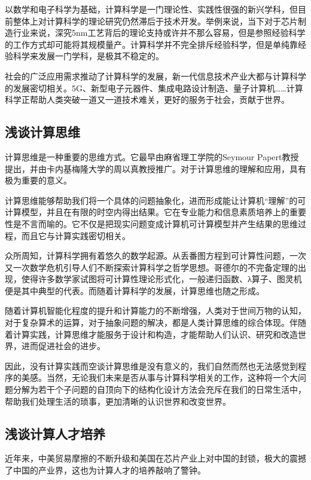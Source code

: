 \documentclass{article}
\begin{document}
以数学和电子科学为基础，计算科学是一门理论性、实践性很强的新兴学科，但目前整体上对计算科学的理论研究仍然滞后于技术开发。举例来说，当下对于芯片制造行业来说，深究5nm工艺背后的理论支持或许并不那么容易，但是参照经验科学的工作方式却可能将其规模量产。计算科学并不完全排斥经验科学，但是单纯靠经验科学来发展一门学科，是极其不稳定的。

社会的广泛应用需求推动了计算科学的发展，新一代信息技术产业大都与计算科学的发展密切相关。5G、新型电子元器件、集成电路设计制造、量子计算机……计算科学正帮助人类突破一道又一道技术难关，更好的服务于社会，贡献于世界。

\subsection{浅谈计算思维}

计算思维是一种重要的思维方式\cite{ref1}。它最早由麻省理工学院的Seymour Papert教授提出\cite{ref2}，并由卡内基梅隆大学的周以真教授推广\cite{ref3}。对于计算思维的理解和应用，具有极为重要的意义。

计算思维能够帮助我们将一个具体的问题抽象化，进而形成能让计算机“理解”的可计算模型，并且在有限的时空内得出结果。它在专业能力和信息素质培养上的重要性是不言而喻的。它不仅是把现实问题变成计算机可计算模型并产生结果的思维过程，而且它与计算实践密切相关。

众所周知，计算科学拥有着悠久的数学起源。从丢番图方程到可计算性问题，一次又一次数学危机引导人们不断探索计算科学之哲学思想。哥德尔的不完备定理的出现，使得许多数学家试图将可计算性理论形式化，一般递归函数、λ算子、图灵机便是其中典型的代表。而随着计算科学的发展，计算思维也随之形成。

随着计算机智能化程度的提升和计算能力的不断增强，人类对于世间万物的认知，对于复杂算术的运算，对于抽象问题的解决，都是人类计算思维的综合体现。伴随着计算实践，计算思维才能服务于设计和构造，才能帮助人们认识、研究和改造世界，进而促进社会的进步。

因此，没有计算实践而空谈计算思维是没有意义的，我们自然而然也无法感觉到程序的美感。当然，无论我们未来是否从事与计算科学相关的工作，这种将一个大问题分解为若干个子问题的自顶向下的结构化设计方法会充斥在我们的日常生活中，帮助我们处理生活的琐事，更加清晰的认识世界和改变世界。

\subsection{浅谈计算人才培养}

近年来，中美贸易摩擦的不断升级和美国在芯片产业上对中国的封锁，极大的震撼了中国的产业界，这也为计算人才的培养敲响了警钟。
\end{document}
